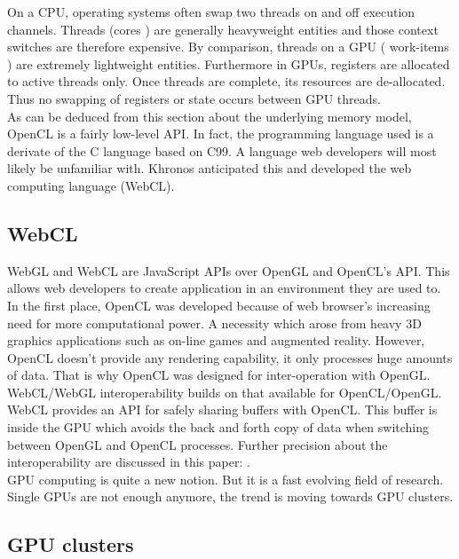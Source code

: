 On a CPU, operating systems often swap two threads on and off execution
channels. Threads (cores ) are generally heavyweight entities and those context
switches are therefore expensive. By comparison, threads on a GPU ( work-items
) are extremely lightweight entities. Furthermore in GPUs, registers are
allocated to active threads only. Once threads are complete, its resources are
de-allocated.  Thus no swapping of registers or state occurs between GPU
threads. \citep{Reference4}\\

As can be deduced from this section about the underlying memory model, OpenCL is a
fairly low-level API. In fact, the programming language used is a derivate of
the C language based on C99. A language web developers will most likely be
unfamiliar with. Khronos anticipated this and developed the web computing
language (WebCL).\\

\subsection{WebCL}

WebGL and WebCL are JavaScript APIs over OpenGL and OpenCL's API. This allows
web developers to create application in an environment they are used to.\\

In the first place, OpenCL was developed because of web browser's increasing
need for more computational power. A necessity which arose from heavy 3D
graphics applications such as on-line games and augmented reality. However,
OpenCL doesn’t provide any rendering capability, it only processes huge amounts
of data. That is why OpenCL was designed for inter-operation with OpenGL.
WebCL/WebGL interoperability builds on that available for OpenCL/OpenGL. WebCL
provides an API for safely sharing buffers with OpenCL. This buffer is inside
the GPU which avoids the back and forth copy of data when switching between
OpenGL and OpenCL processes. Further precision about the interoperability are
discussed in this paper: \citep{Reference6}.\\

GPU computing is quite a new notion. But it is a fast evolving field of
research. Single GPUs are not enough anymore, the trend is moving towards GPU
clusters.\\

\subsection{GPU clusters}

